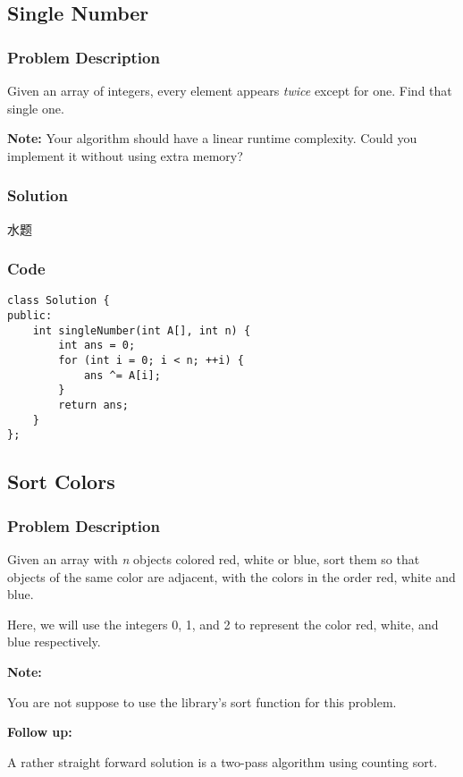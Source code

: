 \documentclass[courier]{article}
\begin{document}
\begin{CJK*}{UTF8}{gkai}
\subsection{ Single Number }

\subsubsection*{Problem Description}
Given an array of integers, every element appears \emph{twice} except for one. Find that single one.

\textbf{Note:}
Your algorithm should have a linear runtime complexity. Could you implement it without using extra memory?



\subsubsection*{Solution}
水题

\subsubsection*{Code}
\begin{lstlisting}
class Solution {
public:
    int singleNumber(int A[], int n) {
        int ans = 0;
        for (int i = 0; i < n; ++i) {
            ans ^= A[i];
        }
        return ans;
    }
}; 
\end{lstlisting}


\subsection{ Sort Colors }

\subsubsection*{Problem Description}
Given an array with \emph{n} objects colored red, white or blue, sort them so that objects of the same color are adjacent, with the colors in the order red, white and blue.

Here, we will use the integers 0, 1, and 2 to represent the color red, white, and blue respectively.

\textbf{Note:}


You are not suppose to use the library's sort function for this problem.

\textbf{Follow up:}


A rather straight forward solution is a two-pass algorithm using counting sort.



\end{CJK*}
\end{document}
